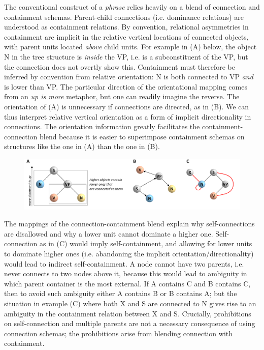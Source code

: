   The conventional construct of a \textit{phrase} relies heavily on a blend of connection and containment schemas. Parent-child connections (i.e. dominance relations) are understood as containment relations. By convention, relational asymmetries in containment are implicit in the relative vertical locations of connected objects, with parent units located \textit{above} child units. For example in (A) below, the object N in the tree structure is \textit{inside} the VP, i.e. is a subconstituent of the VP, but the connection does not overtly show this. Containment must therefore be inferred by convention from relative orientation: N is both connected to VP \textit{and} is lower than VP. The particular direction of the orientational mapping comes from an \textit{up is more} metaphor, but one can readily imagine the reverse. The orientation of (A) is unnecessary if connections are directed, as in (B). We can thus interpret relative vertical orientation as a form of implicit directionality in connections. The orientation information greatly facilitates the containment-connection blend because it is easier to superimpose containment schemas on structures like the one in (A) than the one in (B). 

  
\begin{figure}
\includegraphics[width=\textwidth]{figures/Tilsen-img35.png}
\caption{\missingcaption}
\label{fig:}
\end{figure}
 

  The mappings of the connection-containment blend explain why self-connections are disallowed and why a lower unit cannot dominate a higher one. Self-connection as in (C) would imply self-containment, and allowing for lower units to dominate higher ones (i.e. abandoning the implicit orientation/directionality) would lead to indirect self-containment. A node cannot have two parents, i.e. never connects to two nodes above it, because this would lead to ambiguity in which parent container is the most external. If A contains C and B contains C, then to avoid such ambiguity either A contains B or B contains A; but the situation in example (C) where both X and S are connected to N gives rise to an ambiguity in the containment relation between X and S. Crucially, prohibitions on self-connection and multiple parents are not a necessary consequence of using connection schemas; the prohibitions arise from blending connection with containment.

